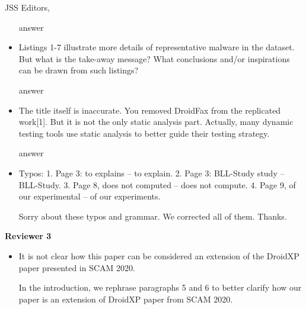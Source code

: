 \documentclass{letter}
\begin{document}
\begin{letter}{JSS Editors,}
\begin{itemize}
\vspace{0.2cm}

{\color{blue}{\bf Answer.} answer}

\vspace{0.2cm}

\item Listings 1-7 illustrate more details of representative malware in the dataset. But what is the take-away message? What 
conclusions and/or inspirations can be drawn from such listings?


\vspace{0.2cm}

{\color{blue}{\bf Answer.} answer}

\vspace{0.2cm}

\item The title itself is inaccurate. You removed DroidFax from the replicated work[1]. But it is not the only static analysis part. 
Actually, many dynamic testing tools use static analysis to better guide their testing strategy.


\vspace{0.2cm}

{\color{blue}{\bf Answer.} answer}

\vspace{0.2cm}

\item Typos:
1. Page 3: to explains -- to explain.
2. Page 3: BLL-Study study -- BLL-Study.
3. Page 8, does not computed -- does not compute.
4. Page 9, of our experimental -- of our experiments.


\vspace{0.2cm}

{\color{blue}{\bf Answer.} Sorry about these typos and grammar. We corrected all of them. Thanks.}

\end{itemize}

{\bf Reviewer 3}

\begin{itemize}

\item It is not clear how this paper can be considered an extension of the DroidXP paper presented in SCAM 2020.


\vspace{0.2cm}

{\color{blue}{\bf Answer.} In the introduction, we rephrase paragraphs 5 and 6 to better clarify how our paper is an extension of DroidXP paper from SCAM 2020.}


\end{itemize}
\end{letter}
\end{document}
